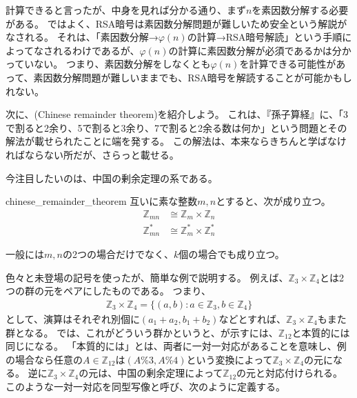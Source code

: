 
計算できると言ったが、中身を見れば分かる通り、まず$n$を素因数分解する必要がある。
ではよく、RSA暗号は素因数分解問題が難しいため安全という解説がなされる。
それは、「素因数分解→$\varphi(n)$の計算→RSA暗号解読」という手順によってなされるわけであるが、$\varphi(n)$の計算に素因数分解が必須であるかは分かっていない。
つまり、素因数分解をしなくとも$\varphi(n)$を計算できる可能性があって、素因数分解問題が難しいままでも、RSA暗号を解読することが可能かもしれない。

次に、(Chinese remainder theorem)を紹介しよう。
これは、『孫子算経』に、「3で割ると2余り、5で割ると3余り、7で割ると2余る数は何か」という問題とその解法が載せられたことに端を発する。
この解法は、本来ならきちんと学ばなければならない所だが、さらっと載せる。


今注目したいのは、中国の剰余定理の系である。

\begin{Coro}{}{chinese_remainder_theorem}
互いに素な整数$m,n$とすると、次が成り立つ。
\begin{align*}
\mathbb{Z}_{mn} &\cong \mathbb{Z}_m \times \mathbb{Z}_n\\
\mathbb{Z}_{mn}^* &\cong \mathbb{Z}_m^* \times \mathbb{Z}_n^*
\end{align*}
\end{Coro}

一般には$m,n$の2つの場合だけでなく、$k$個の場合でも成り立つ。

色々と未登場の記号を使ったが、簡単な例で説明する。
例えば、$\mathbb{Z}_3\times\mathbb{Z}_4$とは2つの群の元をペアにしたものである。
つまり、
\begin{align*}
\mathbb{Z}_3\times\mathbb{Z}_4 = \{(a,b) : a \in \mathbb{Z}_3, b \in \mathbb{Z}_4\}
\end{align*}
として、演算はそれぞれ別個に$(a_1+a_2,b_1+b_2)$などとすれば、$\mathbb{Z}_3\times\mathbb{Z}_4$もまた群となる。
では、これがどういう群かというと、が示すには、$\mathbb{Z}_{12}$と本質的には同じになる。
「本質的には」とは、両者に一対一対応があることを意味し、例の場合なら任意の$A\in\mathbb{Z}_{12}$は$(A \% 3, A \% 4)$という変換によって$\mathbb{Z}_3\times\mathbb{Z}_4$の元になる。
逆に$\mathbb{Z}_3\times\mathbb{Z}_4$の元は、中国の剰余定理によって$\mathbb{Z}_{12}$の元と対応付けられる。
このような一対一対応を同型写像と呼び、次のように定義する。

